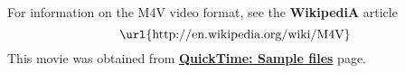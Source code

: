 \documentclass{article}
\begin{document}
\maketitle

\begin{center}
\end{center}
For information on the M4V video format, see the \textbf{WikipediA} article
\begin{equation*}
    \text{\url{http://en.wikipedia.org/wiki/M4V}}
\end{equation*}
This movie was obtained from \textbf{\href{http://support.apple.com/kb/ht1425}{QuickTime: Sample files}}
page.
\end{document}
